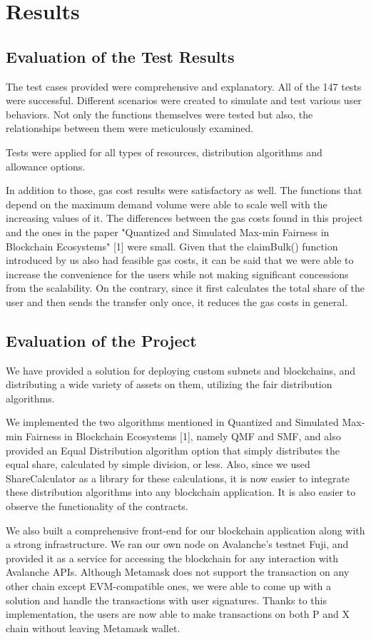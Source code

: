 \documentclass[a4paper,12pt]{report}
\begin{document}
\chapter{Results}
\section{Evaluation of the Test Results}
The test cases provided were comprehensive and explanatory. All of the 147 tests were successful. Different scenarios were created to simulate and test various user behaviors. Not only the functions themselves were tested but also, the relationships between them were meticulously examined.

Tests were applied for all types of resources, distribution algorithms and allowance options.

In addition to those, gas cost results were satisfactory as well. The functions that depend on the maximum demand volume were able to scale well with the increasing values of it. The differences between the gas costs found in this project and the ones in the paper "Quantized and Simulated Max-min Fairness in Blockchain Ecosystems" [1] were small. Given that the claimBulk() function introduced by us also had feasible gas costs, it can be said that we were able to increase the convenience for the users while not making significant concessions from the scalability. On the contrary, since it first calculates the total share of the user and then sends the transfer only once, it reduces the gas costs in general.
\newpage
\section{Evaluation of the Project}
We have provided a solution for deploying custom subnets and blockchains, and distributing a wide variety of assets on them, utilizing the fair distribution algorithms.

We implemented the two algorithms mentioned in Quantized and Simulated Max-min Fairness in Blockchain Ecosystems [1], namely QMF and SMF, and also provided an Equal Distribution algorithm option that simply distributes the equal share, calculated by simple division, or less. Also, since we used ShareCalculator as a library for these calculations, it is now easier to integrate these distribution algorithms into any blockchain application. It is also easier to observe the functionality of the contracts.

We also built a comprehensive front-end for our blockchain application along with a strong infrastructure. We ran our own node on Avalanche’s testnet Fuji, and provided it as a service for accessing the blockchain for any interaction with Avalanche APIs. Although Metamask does not support the transaction on any other chain except EVM-compatible ones, we were able to come up with a solution and handle the transactions with user signatures. Thanks to this implementation, the users are now able to make transactions on both P and X chain without leaving Metamask wallet.
\end{document}
